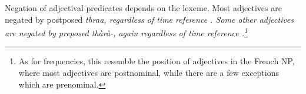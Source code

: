 %
%
%
%

 
Negation of adjectival predicates depends on the lexeme. Most adjectives are negated by postposed \em thraa\em, regardless of time reference . Some other adjectives are negated by preposed \em thàrà-\em, again regardless of time reference .\footnote{As for frequencies, this resemble the position of adjectives in the French NP, where most adjectives are postnominal, while there are a few exceptions which are prenominal.}




